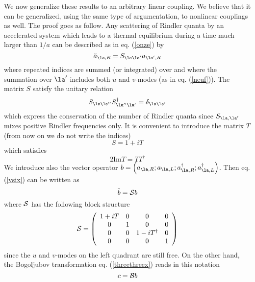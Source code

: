 \documentclass[12pt]{article}
\begin{document}
We now generalize these results to an arbitrary linear coupling.
We
believe
that it can be generalized, using the same type of argumentation,
 to nonlinear couplings as well. The
proof goes as follow. Any scattering of Rindler quanta by an accelerated
system which leads to a thermal equilibrium during a time much larger
than
$1/a$ can be described as in eq. (\ref{onze}) by
\begin{equation}
\tilde a_{\la,R} =  S_{\la \la^\prime} a_{\la^\prime,R}
 \label{vsix}
\end{equation}
where repeated indices are summed (or integrated) over and where the
summation over $\la^\prime$ includes both $u$ and $v$-modes (as in
eq. (\ref{neuf})).
 The matrix $S$ satisfy the
unitary relation
\begin{equation}
 S_{\la \la^{\prime\prime}}  S_{\la^{\prime\prime} \la^\prime}^\dagger
 = \delta _{\la \la^\prime}
 \label{vseven}
\end{equation}
which express the conservation of the number of Rindler quanta since
$S_{\la, \la^\prime}$ mixes positive Rindler frequencies only.
It is convenient to introduce the matrix $T$ (from now on we
do not write the indices)
\begin{equation}
S=1+iT
 \label{veight}
\end{equation}
which satisfies
\begin{equation}
2 \mbox{Im} T = TT^\dagger
\label{vnine}
\end{equation}
We introduce also the vector operator $b= \left( a_{\la,R};a_{\la,L};
a_{\la,R}^\dagger;a_{\la,L}^\dagger \right) $. Then eq. (\ref{vsix})
 can be written as
\begin{equation}
\tilde b= {\cal  S} b
\label{trente}
\end{equation}
where $ {\cal S}$ has the following block structure
\begin{equation}
 {\cal  S} =
\left( \begin{array}{cccc}
1+iT & 0 & 0 & 0 \\
0 & 1 & 0 & 0 \\
0 & 0 & 1-iT^\dagger & 0 \\
0 & 0 & 0 & 1
\end{array} \right)
\label{tone}
\end{equation}
since the $u$ and $v$-modes on the left quadrant are still free.
On the other hand, the Bogoljubov transformation eq. (\ref{threethreex})
 reads in this
notation
\begin{equation}
c ={ \cal  B} b
\label{ttwo}
\end{equation}
\end{document}
